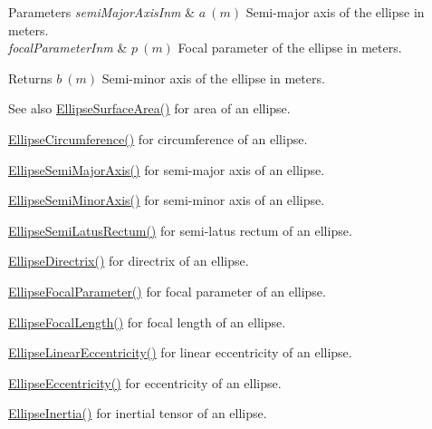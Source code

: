 \begin{DoxyParams}{Parameters}
{\em semi\+Major\+Axis\+Inm} & $ a\ (m)$ Semi-\/major axis of the ellipse in meters. \\
\hline
{\em focal\+Parameter\+Inm} & $ p\ (m)$ Focal parameter of the ellipse in meters. \\
\hline
\end{DoxyParams}
\begin{DoxyReturn}{Returns}
$ b\ (m)$ Semi-\/minor axis of the ellipse in meters. 
\end{DoxyReturn}
\begin{DoxySeeAlso}{See also}
\mbox{\hyperlink{group___e_g_x_math-_geometry-2_d-_ellipse-_surface_area_ga4ce8c8323e9718ce5458f4ab7f6d823d}{Ellipse\+Surface\+Area()}} for area of an ellipse. 

\mbox{\hyperlink{group___e_g_x_math-_geometry-2_d-_ellipse-_circumference_ga4172802ac674eb53467b44928ac635c7}{Ellipse\+Circumference()}} for circumference of an ellipse. 

\mbox{\hyperlink{group___e_g_x_math-_geometry-2_d-_ellipse-_semi_major_axis_ga646a2ca065f4ac3f666a9ea22f3bb527}{Ellipse\+Semi\+Major\+Axis()}} for semi-\/major axis of an ellipse. 

\mbox{\hyperlink{group___e_g_x_math-_geometry-2_d-_ellipse-_semi_minor_axis_gae461acf3333565d69527dd86e9aa2b32}{Ellipse\+Semi\+Minor\+Axis()}} for semi-\/minor axis of an ellipse. 

\mbox{\hyperlink{group___e_g_x_math-_geometry-2_d-_ellipse-_semi_latus_rectum_gacfd1844eb4ef3d1ee3c0b460a6442ae6}{Ellipse\+Semi\+Latus\+Rectum()}} for semi-\/latus rectum of an ellipse. 

\mbox{\hyperlink{group___e_g_x_math-_geometry-2_d-_ellipse-_directrix_gace8f72a8efbc9c18d3eb689151405106}{Ellipse\+Directrix()}} for directrix of an ellipse. 

\mbox{\hyperlink{group___e_g_x_math-_geometry-2_d-_ellipse-_focal_parameter_ga4cd01a38c72c092ef9791351948bf69b}{Ellipse\+Focal\+Parameter()}} for focal parameter of an ellipse. 

\mbox{\hyperlink{group___e_g_x_math-_geometry-2_d-_ellipse-_focal_length_gab8d63de7640c880cfecaeada6f2afdac}{Ellipse\+Focal\+Length()}} for focal length of an ellipse. 

\mbox{\hyperlink{group___e_g_x_math-_geometry-2_d-_ellipse-_linear_eccentricity_gac70b3010e30aa8b73deb50fe2b9b9a91}{Ellipse\+Linear\+Eccentricity()}} for linear eccentricity of an ellipse. 

\mbox{\hyperlink{group___e_g_x_math-_geometry-2_d-_ellipse-_eccentricity_ga6a0a7fba17f782616894cfc447628c33}{Ellipse\+Eccentricity()}} for eccentricity of an ellipse. 

\mbox{\hyperlink{group___e_g_x_math-_geometry-2_d-_ellipse-_inertia_ga10a3049c2f04b50f271fb01dc62e4cf8}{Ellipse\+Inertia()}} for inertial tensor of an ellipse. 
\end{DoxySeeAlso}
